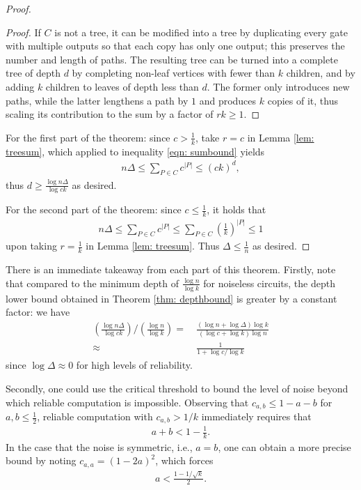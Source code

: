 \documentclass[12pt,reqno]{amsart}
\theoremstyle{plain} %
\theoremstyle{remark}
\theoremstyle{definition}
\begin{document}
\begin{proof}
\begin{proof}
    If $C$ is not a tree, it can be modified into a tree by duplicating every gate with multiple outputs so that each copy has only one output; this preserves the number and length of paths. The resulting tree can be turned into a complete tree of depth $d$ by completing non-leaf vertices with fewer than $k$ children, and by adding $k$ children to leaves of depth less than $d$. The former only introduces new paths, while the latter lengthens a path by $1$ and produces $k$ copies of it, thus scaling its contribution to the sum by a factor of $rk\ge1$.
\end{proof}

For the first part of the theorem: since $c>\frac{1}{k}$, take $r=c$ in Lemma \ref{lem: treesum}, which applied to inequality \ref{eqn: sumbound} yields
\begin{align}
    n\Delta\le\sum_{P\in C}c^{|P|}\le (ck)^d,
\end{align}
thus $d\ge \frac{\log n\Delta}{\log ck}$ as desired.
    
For the second part of the theorem: since $c\le\frac{1}{k}$, it holds that
\begin{align}
    n\Delta\le \sum_{P\in C}c^{|P|}\le \sum_{P\in C}\left(\frac{1}{k}\right)^{|P|}\le 1
\end{align}
upon taking $r=\frac{1}{k}$ in Lemma \ref{lem: treesum}. Thus $\Delta\le\frac{1}{n}$ as desired.
\end{proof}

There is an immediate takeaway from each part of this theorem. Firstly, note that compared to the minimum depth of $\frac{\log n}{\log k}$ for noiseless circuits, the depth lower bound obtained in Theorem \ref{thm: depthbound} is greater by a constant factor: we have
\begin{align}
    \left(\frac{\log n\Delta}{\log ck}\right)/\left(\frac{\log n}{\log k}\right)=&\ \frac{(\log n+\log\Delta)\log k}{(\log c+\log k)\log n}\\
    \approx&\ \frac{1}{1+\log c/\log k}
\end{align}
since $\log\Delta\approx0$ for high levels of reliability.

Secondly, one could use the critical threshold to bound the level of noise beyond which reliable computation is impossible. Observing that $c_{a,b}\le1-a-b$ for $a,b\le\frac{1}{2}$, reliable computation with $c_{a,b}> 1/k$ immediately requires that 
\begin{align}
    a+b<1-\frac{1}{k}.
\end{align} 
In the case that the noise is symmetric, i.e., $a=b$, one can obtain a more precise bound by noting $c_{a,a}=(1-2a)^2$, which forces 
\begin{align}
    a<\frac{1-1/\sqrt{k}}{2}.
\end{align}
\end{document}
